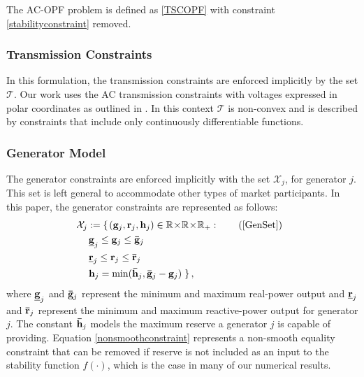 \documentclass[lettersize,journal]{IEEEtran}
\begin{document}
The AC-OPF problem is defined as \eqref{TSCOPF} with constraint \eqref{stabilityconstraint} removed.

\subsubsection{Transmission Constraints}
In this formulation, the transmission constraints are enforced implicitly by the set $\mathcal{T}$.  
Our work uses the AC transmission constraints with voltages expressed in polar coordinates as outlined in \cite{cain2012history}.  In this context $\mathcal{T}$ is non-convex and is described by constraints that include only continuously differentiable functions.   

\subsubsection{Generator Model}
The generator constraints are enforced implicitly with the set $\mathcal{X}_j$, for generator $j$. This set is left general to accommodate other types of market participants.  
 In this paper, the generator constraints are represented as follows:
\begin{subequations}\label{GenSet}
\begin{align}
\hspace{-5pt}\mathcal{X}_j:=\left\{\right.& (\bold{g}_j,\bold{r}_j,\bold{h}_j)\in \mathbb{R}\!\times\!\mathbb{R}\!\times\!\mathbb{R}_+: \tag{\ref{GenSet}}\\
&\hspace{-21pt}\bold{\underline{g}}_j\leq \bold{g}_j \leq \bold{\bar{g}}_j \\
&\hspace{-21pt}\bold{\underline{r}}_j\leq \bold{r}_j \leq \bold{\bar{r}}_j \\
&\hspace{-21pt}\bold{h}_j = \min(\bold{\bar{h}}_j,\bold{\bar{g}}_j-\bold{g}_j)\left.\right\},\label{nonsmoothconstraint}\end{align} \end{subequations}
where $\bold{\underline{g}}_j$ and $\bold{\bar{g}}_j$ represent the minimum and maximum real-power output and $\bold{\underline{r}}_j$ and $\bold{\bar{r}}_j$ represent the minimum and maximum reactive-power output for generator $j$.  The constant $\bold{\bar{h}}_j$ models the maximum reserve a generator $j$ is capable of providing.  Equation \eqref{nonsmoothconstraint} represents a non-smooth equality constraint that can be removed if reserve is not included as an input to the stability function $f(\cdot)$, which is the case in many of our numerical results.%
\end{document}

